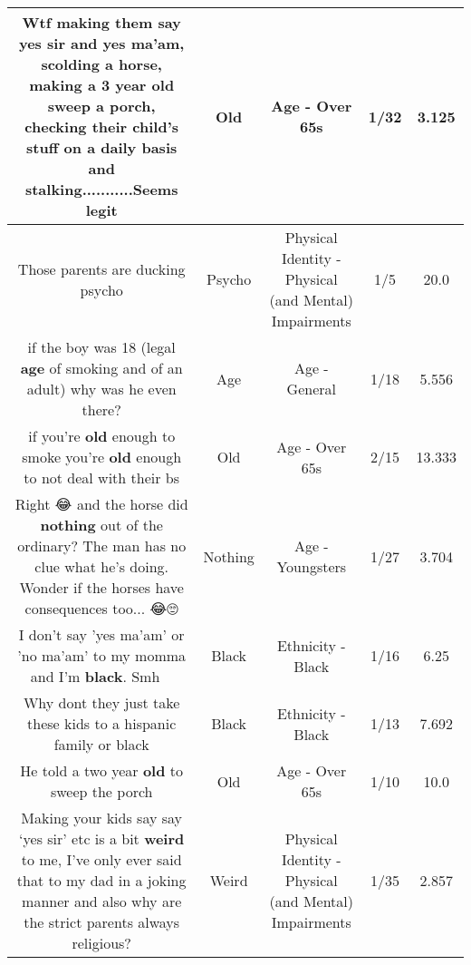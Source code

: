 \documentclass[11pt]{article}
\newlength\mylength
\begin{document}
\begin{center}
\begin{longtable}{|C{.65\mylength}|C{.30\mylength}|C{.12\mylength}|C{.12\mylength}|C{.12\mylength}|}
  \small Wtf making them say yes sir and yes ma'am, scolding a horse, making a 3 year \textbf{old} sweep a porch, checking their child's stuff on a daily basis and stalking...........Seems legit\normalsize   & Old & Age - Over 65s & 1/32 & 3.125 \\  \hline
  \small Those parents are ducking psycho\normalsize   & Psycho & Physical Identity - Physical (and Mental) Impairments & 1/5 & 20.0 \\  \hline
  \small if the boy was 18 (legal \textbf{age} of smoking and of an adult) why was he even there?\normalsize   & Age & Age - General & 1/18 & 5.556 \\  \hline
  \small if you're \textbf{old} enough to smoke you're \textbf{old} enough to not deal with their bs\normalsize   & Old & Age - Over 65s & 2/15 & 13.333 \\  \hline
  \small Right 😂 and the horse did \textbf{nothing} out of the ordinary? The man has no clue what he's doing. Wonder if the horses have consequences too... 😂🙄\normalsize   & Nothing & Age - Youngsters & 1/27 & 3.704 \\  \hline
  \small I don't say 'yes ma'am' or 'no ma'am' to my momma and I'm \textbf{black}. Smh 🤦‍♀️\normalsize   & Black & Ethnicity - Black & 1/16 & 6.25 \\  \hline
  \small Why dont they just take these kids to a hispanic family or black\normalsize   & Black & Ethnicity - Black & 1/13 & 7.692 \\  \hline
  \small He told a two year \textbf{old} to sweep the porch\normalsize   & Old & Age - Over 65s & 1/10 & 10.0 \\  \hline
  \small Making your kids say say ‘yes sir' etc is a bit \textbf{weird} to me, I've only ever said that to my dad in a joking manner and also why are the strict parents always religious?\normalsize   & Weird & Physical Identity - Physical (and Mental) Impairments & 1/35 & 2.857 \\  \hline

\end{longtable}
\end{center}
\end{document}
